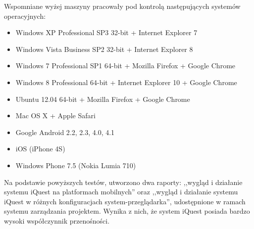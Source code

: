 Wspomniane wyżej maszyny pracowały pod kontrolą następujących systemów operacyjnych:
\begin{itemize}
\item{Windows XP Professional SP3 32-bit + Internet Explorer 7}
\item{Windows Vista Business SP2 32-bit + Internet Explorer 8}
\item{Windows 7 Professional SP1 64-bit + Mozilla Firefox + Google Chrome}
\item{Windows 8 Professional 64-bit + Internet Explorer 10 + Google Chrome}
\item{Ubuntu 12.04 64-bit + Mozilla Firefox + Google Chrome}
\item{Mac OS X + Apple Safari}
\item{Google Android 2.2, 2.3, 4.0, 4.1}
\item{iOS (iPhone 4S)}
\item{Windows Phone 7.5 (Nokia Lumia 710)}
\end{itemize}

Na podstawie powyższych testów, utworzono dwa raporty: ,,wygląd i działanie systemu iQuest na platformach mobilnych'' oraz ,,wygląd i działanie systemu iQuest w różnych konfiguracjach system-przeglądarka'', udostępnione w ramach systemu zarządzania projektem\cite{Redmine:ProjDocs}. Wynika z nich, że system iQuest posiada bardzo wysoki współczynnik przenośności.